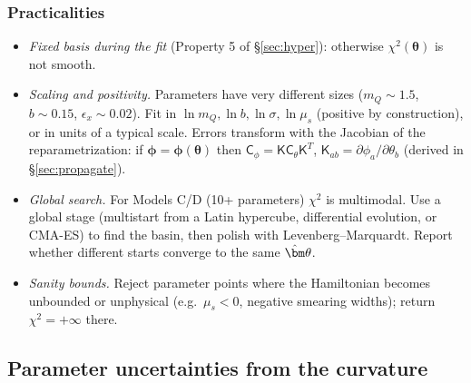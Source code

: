 \documentclass[11pt,a4paper]{article}
\numberwithin{equation}{section}
\theoremstyle{definition}
\theoremstyle{plain}
\theoremstyle{remark}
\numberwithin{algorithm}{section}
\newcommand{\mus}{\mu_s}
\newcommand{\sK}{\mathsf K}
\newcommand{\sC}{\mathsf C}
\newcommand{\vth}{\bm\theta}
\begin{document}
\subsubsection{Practicalities}
\begin{itemize}[leftmargin=1.3em,itemsep=2pt]
\item \emph{Fixed basis during the fit} (Property 5 of \S\ref{sec:hyper}): otherwise $\chi^2(\vth)$ is not smooth.
\item \emph{Scaling and positivity.} Parameters have very different sizes ($m_Q\sim1.5$, $b\sim0.15$, $\epsilon_x\sim0.02$). Fit in $\ln m_Q,\ln b,\ln\sigma,\ln\mus$ (positive by construction), or in units of a typical scale. Errors transform with the Jacobian of the reparametrization: if $\bm\phi=\bm\phi(\vth)$ then $\sC_\phi=\sK\sC_\theta\sK^T$, $\sK_{ab}=\partial\phi_a/\partial\theta_b$ (derived in \S\ref{sec:propagate}).
\item \emph{Global search.} For Models C/D (10+ parameters) $\chi^2$ is multimodal. Use a global stage (multistart from a Latin hypercube, differential evolution, or CMA-ES) to find the basin, then polish with Levenberg--Marquardt. Report whether different starts converge to the same $\hat\vth$.
\item \emph{Sanity bounds.} Reject parameter points where the Hamiltonian becomes unbounded or unphysical (e.g.\ $\mus<0$, negative smearing widths); return $\chi^2=+\infty$ there.
\end{itemize}

\subsection{Parameter uncertainties from the curvature}\label{sec:cov}
\end{document}
